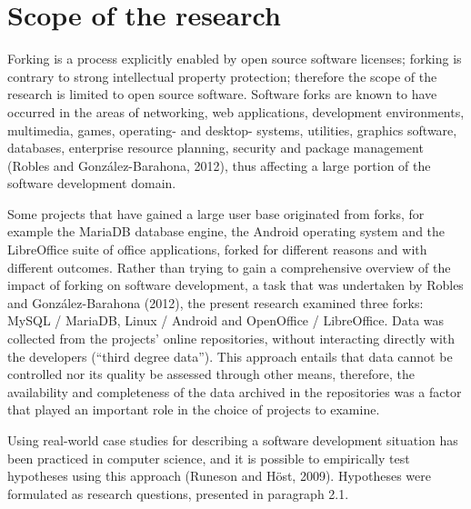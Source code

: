 

\section{Scope of the research}

Forking is a process explicitly enabled by open source software licenses; forking is contrary to strong intellectual property protection; therefore the scope of the research is limited to open source software. Software forks are known to have occurred in the areas of networking, web applications, development environments, multimedia, games, operating- and desktop- systems, utilities, graphics software, databases, enterprise resource planning, security and package management (Robles and González-Barahona, 2012), thus affecting a large portion of the software development domain.

Some projects that have gained a large user base originated from forks, for example the MariaDB database engine, the Android operating system and the LibreOffice suite of office applications, forked for different reasons and with different outcomes. Rather than trying to gain a comprehensive overview of the impact of forking on software development, a task that was undertaken by Robles and González-Barahona (2012), the present research examined three forks: MySQL / MariaDB, Linux / Android and OpenOffice / LibreOffice. Data was collected from the projects' online repositories, without interacting directly with the developers (“third degree data”). This approach entails that data cannot be controlled nor its quality be assessed through other means, therefore, the availability and completeness of the data archived in the repositories was a factor that played an important role in the choice of projects to examine.

Using real-world case studies for describing a software development situation has been practiced in computer science, and it is possible to empirically test hypotheses using this approach (Runeson and Höst, 2009). Hypotheses were formulated as research questions, presented in paragraph 2.1.

